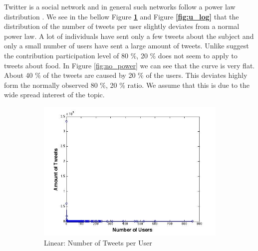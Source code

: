 Twitter is a social network and in general such networks follow a power law distribution \cite{Whittaker:1998}. We see in the bellow Figure \textbf{\ref{fig:u_linear}} and Figure \textbf{\ref{fig:u_log}}  that the distribution of the number of tweets per user slightly deviates from a normal power law. A lot of individuals have sent only a few tweets about the subject and only a small number of users have sent a large amount of tweets. Unlike \cite{bild15} suggest the contribution participation level of  80 \%, 20 \%   does not seem to apply to tweets about food. In Figure \ref{fig:no_power} we can see that the curve is very flat. About 40 \% of the tweets are caused by 20 \% of the users. This deviates highly form the normally observed 80 \%, 20 \% ratio. We assume that this is due to the wide spread interest of the topic.
\begin{figure}[H]
        \centering
        \begin{subfigure}[b]{0.5\textwidth}
                \includegraphics[width=\textwidth]{img/anal/linear_user}
                \caption{Linear: Number of Tweets per User}
                \label{fig:u_linear}
        \end{subfigure}%
        ~ %
        \begin{subfigure}[b]{0.5\textwidth}

\end{subfigure}
\end{figure}
